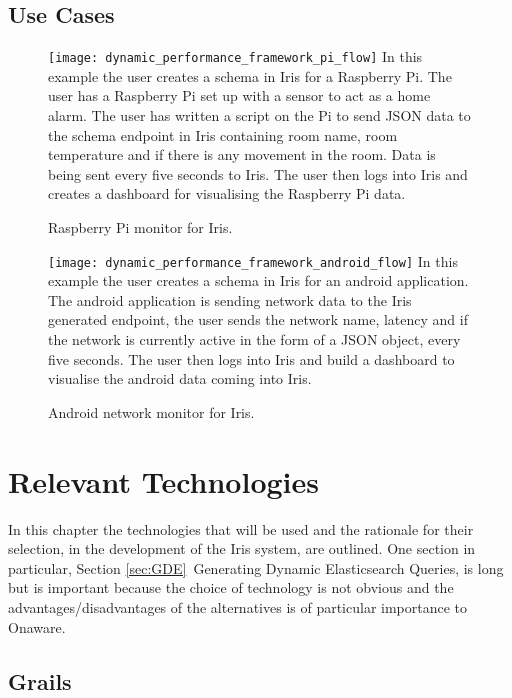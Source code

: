 \documentclass[12pt,a4paper,titlepage]{report}
\begin{document}
\section{Use Cases}

\begin{figure}[H]
\begin{tcolorbox}
\texttt{[image: dynamic\_performance\_framework\_pi\_flow]}
In this example the user creates a schema in Iris for a Raspberry Pi. The user has a Raspberry Pi set up with a sensor to act as a home alarm. The user has written a script on the Pi to send JSON data to the schema endpoint in Iris containing room name, room temperature and if there is any movement in the room. Data is being sent every five seconds to Iris. The user then logs into Iris and creates a dashboard for visualising the Raspberry Pi data.
\end{tcolorbox}
\caption{Raspberry Pi monitor for Iris.}
\end{figure}

\begin{figure}[H]
\begin{tcolorbox}
\texttt{[image: dynamic\_performance\_framework\_android\_flow]}
In this example the user creates a schema in Iris for an android application. The android application is sending network data to the Iris generated endpoint, the user sends the network name, latency and if the network is currently active in the form of a JSON object, every five seconds. The user then logs into Iris and build a dashboard to visualise the android data coming into Iris.
\end{tcolorbox}
\caption{Android network monitor for Iris.}
\end{figure}

\chapter{Relevant Technologies}

In this chapter the technologies that will be used and the rationale for their selection, in the development of the Iris system, are outlined. One section in particular, Section \ref{sec:GDE}\ Generating Dynamic Elasticsearch Queries, is long but is important because the choice of technology is not obvious and the advantages/disadvantages of the alternatives is of particular importance to Onaware.

\section{Grails}
\end{document}
